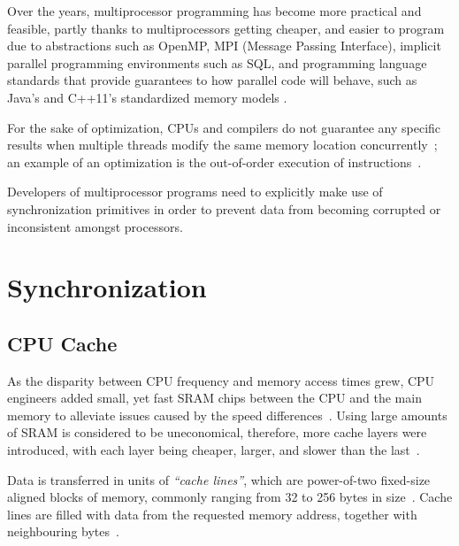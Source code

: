 Over the years, multiprocessor programming has become more practical and
feasible, partly thanks to multiprocessors getting cheaper, and
easier to program due to abstractions such as OpenMP, MPI (Message Passing
Interface), implicit parallel programming environments such as SQL, and
programming language standards that provide guarantees to how parallel code will
behave, such as Java's\citep{javamemorymodel2014} and C++11's
\citep{cppmemorymodel} standardized memory models
\citep[Chapter~2.2]{perfbook2021}.

For the sake of optimization, CPUs and compilers do not guarantee any specific
results when multiple threads modify the same memory location
concurrently~\citep{drepper2007every}; 
an example of an optimization is the out-of-order
execution of instructions~\citep[Appendix~B.7.1]{perfbook2021}.

Developers of multiprocessor
programs need to explicitly make use of synchronization
primitives in order to prevent data from becoming corrupted or inconsistent
amongst processors.

\section{Synchronization}
\subsection{CPU Cache}
As the disparity between CPU frequency and memory access times grew, 
CPU engineers added small, yet fast SRAM chips between the CPU
and the main memory to alleviate issues caused by the speed
differences~\citep{cantrill2008real,drepper2007every,perfbook2021}. Using large
amounts of SRAM is considered to be uneconomical, therefore, more cache layers
were introduced, with each layer being cheaper, larger, and slower than the
last~\citep{drepper2007every,perfbook2021}.

Data is transferred in units of \emph{``cache lines''}, which are power-of-two
fixed-size aligned blocks of memory, commonly ranging from 32 to 256 bytes in
size~\citep[Section~3.2.1]{perfbook2021}. Cache lines are filled with data from the requested memory address,
together with neighbouring bytes~\citep[Section~3.2.1]{perfbook2021}.


